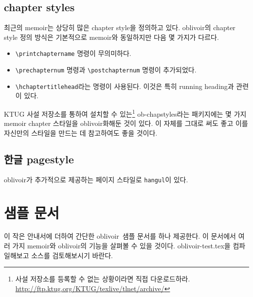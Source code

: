 \documentclass[
	12pt,
	a4paper,
	kosection,
	footnote,
	nobookmarks,
	microtype,
]{oblivoir}
\def\cs#1{\texttt{\textbackslash #1}}
\newcommand\obclass{ob\-liv\-oir\oblivoirallowbreak}
\begin{document}
\subsection{chapter styles}
최근의 memoir는 상당히 많은 chapter style을 정의하고 있다. oblivoir의 chapter style
정의 방식은 기본적으로 memoir와 동일하지만 다음 몇 가지가 다르다.

\begin{itemize}\tightlist
\item \cs{printchaptername} 명령이 무의미하다.
\item \cs{prechapternum} 명령과 \cs{postchapternum} 명령이 추가되었다.
\item \cs{hchaptertitlehead}라는 명령이 사용된다. 이것은 특히 running heading과 관련이 있다.
\end{itemize}

KTUG 사설 저장소를 통하여 설치할 수 있는\footnote{%
	사설 저장소를 등록할 수 없는 상황이라면 직접 다운로드하라. 
	\url{http://ftp.ktug.org/KTUG/texlive/tlnet/archive/}
}
ob-chapstyles라는 패키지에는 몇 가지 memoir
chapter 스타일을 oblivoir화해둔 것이 있다. 이 자체를 그대로 써도 좋고 이를 자신만의 스타일을
만드는 데 참고하여도 좋을 것이다.

\subsection{한글 pagestyle}

oblivoir가 추가적으로 제공하는 페이지 스타일로 \texttt{hangul}이 있다.
\begin{boxedverbatim}
\pagestyle{hangul}
\end{boxedverbatim}

\section{샘플 문서}

이 작은 안내서에 더하여 간단한 \obclass\ 샘플 문서를 하나 제공한다.
이 문서에서 여러 가지 memoir와 \obclass 의 기능을 살펴볼 수 있을 것이다.
oblivoir-test.tex을 컴파일해보고 소스를 검토해보시기 바란다.
\end{document}
